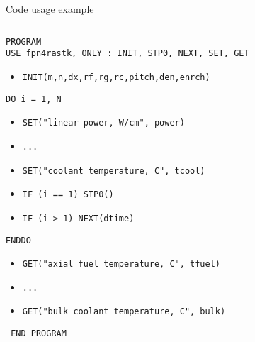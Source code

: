 \documentclass[11pt]{beamer}
\begin{document}
\begin{frame}{Code usage example}
  
  \footnotesize
  
  \begin{columns}
  

  \begin{block}{}
    \texttt{{\color{magenta}PROGRAM}}\\
    \texttt{{\color{magenta}USE} fpn4rastk, {\color{magenta}ONLY} : INIT, STP0, NEXT, SET, GET}
    \begin{itemize}
    \item \texttt{INIT(m,n,dx,rf,rg,rc,pitch,den,enrch)}
    \end{itemize}
    \texttt{{\color{magenta}DO} i = 1, N}        
    \begin{itemize}
    \item \texttt{SET({\color{orange}"linear power, W/cm"}, power)}
    \item \texttt{...}
    \item \texttt{SET({\color{orange}"coolant temperature, C"}, tcool)}
    \item \texttt{{\color{magenta}IF} (i == 1) STP0()}    
    \item \texttt{{\color{magenta}IF} (i  > 1) NEXT(dtime)}        
    \end{itemize}
    \texttt{{\color{magenta}ENDDO}}
    \begin{itemize}    
    \item \texttt{GET({\color{orange}"axial fuel temperature, C"}, tfuel)}
    \item \texttt{...}
    \item \texttt{GET({\color{orange}"bulk coolant temperature, C"}, bulk)}    
    \end{itemize}
    \texttt{ {\color{magenta}END PROGRAM} }
  \end{block}

  \end{columns}

\end{frame}
\end{document}
